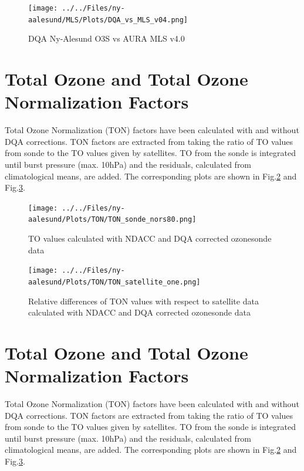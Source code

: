 \documentclass{article}
\begin{document}
\begin{figure}
\centering
\texttt{[image: ../../Files/ny-aalesund/MLS/Plots/DQA\_vs\_MLS\_v04.png]}
\caption{DQA Ny-Alesund O3S vs AURA MLS v4.0 }
\label{fig:dqav04_rs80}
\end{figure}

        \section{Total Ozone and Total Ozone Normalization Factors}

Total Ozone Normalization (TON) factors have been calculated with and without DQA corrections. TON factors are
extracted
from taking the ratio of TO values from sonde to the TO values given by satellites. TO from the sonde is integrated until
burst pressure (max. 10hPa) and the residuals, calculated from climatological means, are added.
The corresponding plots are shown in Fig.\ref{fig:ton1} and  Fig.\ref{fig:ton2}.

                                \begin{figure}
        \centering
\texttt{[image: ../../Files/ny-aalesund/Plots/TON/TON\_sonde\_nors80.png]}
    \caption{TO values calculated with NDACC and DQA corrected ozonesonde data}
            \label{fig:ton1}
    \end{figure}

                                 \begin{figure}
        \centering
\texttt{[image: ../../Files/ny-aalesund/Plots/TON/TON\_satellite\_one.png]}
    \caption{Relative differences of TON values with respect to satellite data calculated with NDACC and DQA corrected ozonesonde data}
            \label{fig:ton2}
    \end{figure}
\section{Total Ozone and Total Ozone Normalization Factors}

Total Ozone Normalization (TON) factors have been calculated with and without DQA corrections. TON factors are
extracted
from taking the ratio of TO values from sonde to the TO values given by satellites. TO from the sonde is integrated until
burst pressure (max. 10hPa) and the residuals, calculated from climatological means, are added.
The corresponding plots are shown in Fig.\ref{fig:ton1} and  Fig.\ref{fig:ton2}.
\end{document}

